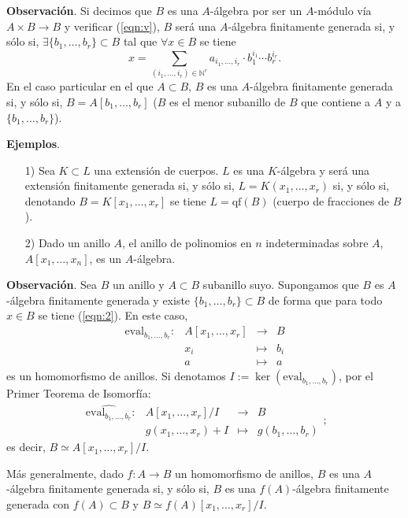 \documentclass[a4paper,12pt]{article}
\newcommand{\N}{\mathbb{N}}
\begin{document}
\textbf{Observación}. Si decimos que $B$ es una $A$-álgebra por ser un $A$-módulo vía $A\times B\longrightarrow B$ y verificar (\ref{eqn:v}), $B$ será una $A$-álgebra finitamente generada si, y sólo si, $\exists\{b_1,\dots,b_r\}\subset B$ tal que $\forall x\in B$ se tiene\begin{equation} \label{eqn:2}x=\sum_{(i_1,\dots,i_r)\in{\N}^r}a_{i_1,\dots,i_r}\cdot b_1^{i_1}\cdots b_r^{i_r}.\end{equation}
En el caso particular en el que $A\subset B$, $B$ es una $A$-álgebra finitamente generada si, y sólo si, $B=A[b_1,\dots,b_r]$ ($B$ es el menor subanillo de $B$ que contiene a $A$ y a $\{b_1,\dots,b_r\}$).

\textbf{Ejemplos}.\begin{itemize}
    \item[1)] Sea $K\subset L$ una extensión de cuerpos. $L$ es una $K$-álgebra y será una extensión finitamente generada si, y sólo si, $L=K(x_1,\dots,x_r)$ si, y sólo si, denotando $B=K[x_1,\dots,x_r]$ se tiene $L=\text{qf}(B)$ (cuerpo de fracciones de $B$).
    \item[2)] Dado un anillo $A$, el anillo de polinomios en $n$ indeterminadas sobre $A$, $A[x_1,\dots,x_n]$, es un $A$-álgebra.
\end{itemize}
\textbf{Observación}. Sea $B$ un anillo y $A\subset B$ subanillo suyo. Supongamos que $B$ es $A$-álgebra finitamente generada y existe $\{b_1,\dots,b_r\}\subset B$ de forma que para todo $x\in B$ se tiene (\ref{eqn:2}). En este caso,$$\begin{array}{rrcl}
    \text{eval}_{b_1,\dots,b_r}:&A[x_1,\dots,x_r]&\longrightarrow&B\\
    &x_i&\longmapsto&b_i\\
    &a&\longmapsto&a
\end{array}$$es un homomorfismo de anillos.
Si denotamos $I:=\ker(\text{eval}_{b_1,\dots,b_r})$, por el Primer Teorema de Isomorfía:$$\begin{array}{rrcl}
    \widehat{\text{eval}_{b_1,\dots,b_r}}:&A[x_1,\dots,x_r]/I&\longrightarrow&B\\
    &g(x_1,\dots,x_r)+I&\longmapsto&g(b_1,\dots,b_r)
\end{array};$$es decir, $B\simeq A[x_1,\dots,x_r]/I$.

Más generalmente, dado $f: A\longrightarrow B$ un homomorfismo de anillos, $B$ es una $A$-álgebra finitamente generada si, y sólo si, $B$ es una $f(A)$-álgebra finitamente generada con $f(A)\subset B$ y $B\simeq f(A)[x_1,\dots,x_r]/I$.
\end{document}
